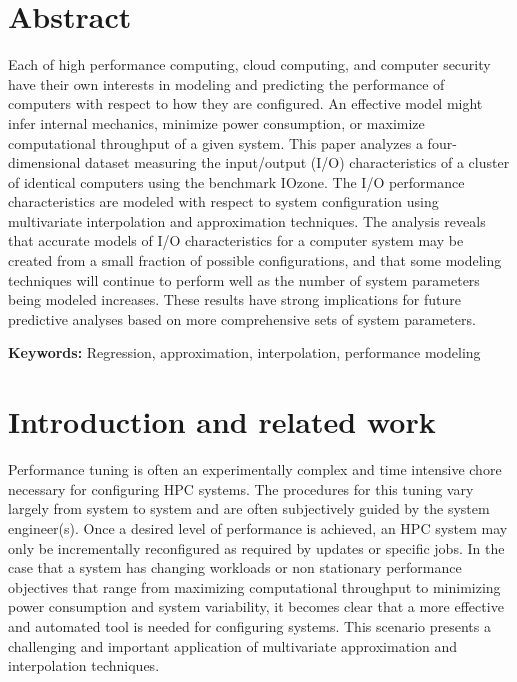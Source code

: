 \documentclass{scspaperproc}
\theoremstyle{scsthe}
\begin{document}
\maketitle

\section*{Abstract}

Each of high performance computing, cloud computing, and computer
security have their own interests in modeling and predicting the
performance of computers with respect to how they are configured. An
effective model might infer internal mechanics, minimize power
consumption, or maximize computational throughput of a given
system. This paper analyzes a four-dimensional dataset measuring the
input/output (I/O) characteristics of a cluster of identical computers
using the benchmark IOzone. The I/O performance characteristics are
modeled with respect to system configuration using multivariate
interpolation and approximation techniques. The analysis reveals that
accurate models of I/O characteristics for a computer system may be
created from a small fraction of possible configurations, and that
some modeling techniques will continue to perform well as the number
of system parameters being modeled increases. These results have
strong implications for future predictive analyses based on more
comprehensive sets of system parameters.

\textbf{Keywords:} Regression, approximation, interpolation,
performance modeling


\section{Introduction and related work}
\label{sec:introduction}

Performance tuning is often an experimentally complex and time
intensive chore necessary for configuring HPC systems. The procedures
for this tuning vary largely from system to system and are often
subjectively guided by the system engineer(s). Once a desired level of
performance is achieved, an HPC system may only be incrementally
reconfigured as required by updates or specific jobs. In the case that
a system has changing workloads or non stationary performance
objectives that range from maximizing computational throughput to
minimizing power consumption and system variability, it becomes clear
that a more effective and automated tool is needed for configuring
systems. This scenario presents a challenging and important
application of multivariate approximation and interpolation
techniques.
\end{document}
